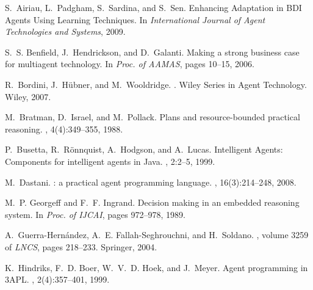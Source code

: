 \documentclass{aamas2010_cameraReady}
\begin{document}
\small

\begin{thebibliography}{10}

\medskip

S.~Airiau, L.~Padgham, S.~Sardina, and S.~Sen.
\newblock Enhancing Adaptation in {BDI} Agents Using Learning Techniques.
\newblock In {\em International Journal of Agent Technologies and Systems},
2009.


S.~S. Benfield, J.~Hendrickson, and D.~Galanti.
\newblock Making a strong business case for multiagent technology.
\newblock In {\em Proc. of AAMAS}, pages 10--15, 2006.

R.~Bordini, J.~H{\"u}bner, and M.~Wooldridge.
.
\newblock Wiley Series in Agent Technology. Wiley, 2007.

M.~Bratman, D.~Israel, and M.~Pollack.
\newblock Plans and resource-bounded practical reasoning.
, 4(4):349--355, 1988.

P.~Busetta, R.~R{\"o}nnquist, A.~Hodgson, and A.~Lucas.
 {I}ntelligent {A}gents: {C}omponents for intelligent agents in
  {J}ava.
, 2:2--5, 1999.

M.~Dastani.
: a practical agent programming language.
, 16(3):214--248, 
  2008.

M.~P. Georgeff and F.~F. Ingrand.
\newblock Decision making in an embedded reasoning system.
\newblock In {\em Proc. of IJCAI}, pages 972--978, 1989.

A.~Guerra-Hern\'andez, A.~E. Fallah-Seghrouchni, and H.~Soldano.
, volume 3259 of {\em
  LNCS}, pages 218--233.
\newblock Springer, 2004.

K.~Hindriks, F.~D. Boer, W.~V.~D. Hoek, and J.~Meyer.
\newblock Agent programming in {3APL}.
, 2(4):357--401, 1999.


\end{thebibliography}
\end{document}
